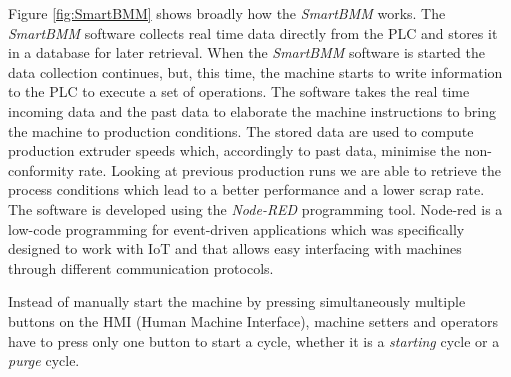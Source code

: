 Figure \ref{fig:SmartBMM} shows broadly how the \textit{SmartBMM} works. The \textit{SmartBMM} software collects real time data directly from the PLC and stores it in a database for later retrieval. When the \textit{SmartBMM} software is started the data collection continues, but, this time, the machine starts to write information to the PLC to execute a set of operations. The software takes the real time incoming data and the past data to elaborate the machine instructions to bring the machine to production conditions. The stored data are used to compute production extruder speeds which, accordingly to past data, minimise the non-conformity rate. Looking at previous production runs we are able to retrieve the process conditions which lead to a better performance and a lower scrap rate. The software is developed using the \textit{Node-RED} \citep{nodered} programming tool. Node-red is a low-code programming for event-driven applications which was specifically designed to work with IoT and that allows easy interfacing with machines through different communication protocols.

Instead of manually start the machine by pressing simultaneously multiple buttons on the HMI (Human Machine Interface), machine setters and operators have to press only one button to start a cycle, whether it is a \textit{starting} cycle or a \textit{purge} cycle.  


